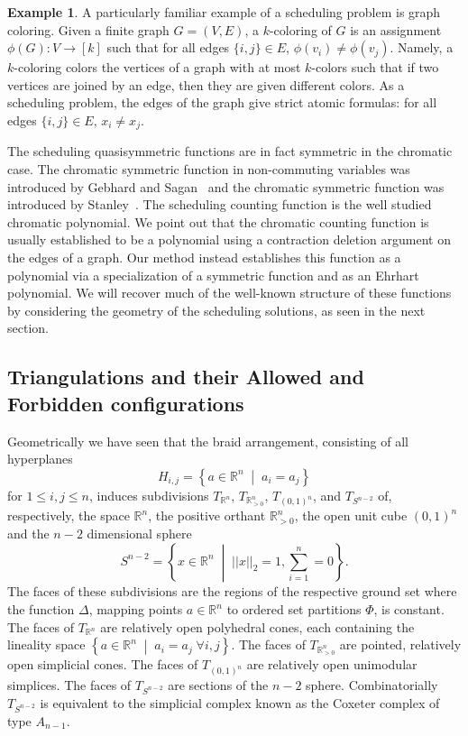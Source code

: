 \documentclass[12pt,reqno]{amsart}
\numberwithin{definition}{section}
\theoremstyle{definition}
\newtheorem{example}[definition]{Example}
\newcommand{\RR}{\mathbb{R}}
\newcommand{\SSS}{\mathcal{S}}
\newcommand{\mset}[2]{ \left\{ #1 \; \middle| \; #2 \right\}}
\newcommand{\T}{T} %
\newcommand{\TRn}{\T_{\RR^n}} %
\newcommand{\TS}{\T_{S^{n-2}}} %
\newcommand{\TP}{\T_{\RR^n_{> 0}}} %
\newcommand{\TC}{\T_{(0,1)^n}} %
\newcommand{\poly}{\chi} %
\begin{document}
\begin{example}
A particularly familiar example of a scheduling problem is graph
coloring.  Given a finite graph $G = (V,E)$, a $k$-coloring of $G$ is
an assignment $\phi(G): V \rightarrow [k]$ such that for all edges
$\{i,j\} \in E$, $\phi(v_i) \neq \phi(v_j)$.  Namely, a
$k$-coloring colors the vertices of a graph with at most $k$-colors
such that if two vertices are joined by an edge, then they are given
different colors.  As a scheduling problem, the edges of the graph
give strict atomic formulas: for all edges $\{i,j\} \in E$, $x_i
\neq x_j$.  

The scheduling quasisymmetric functions are in fact symmetric in the
chromatic case.  The chromatic symmetric function in non-commuting
variables was introduced by Gebhard and Sagan~\cite{GS} and the
chromatic symmetric function was introduced by
Stanley~\cite{stan-chromatic}.  The scheduling counting function is
the well studied chromatic polynomial.  We point out that the
chromatic counting function is usually established to be a polynomial
using a contraction deletion argument on the edges of a graph.  Our
method instead establishes this function as a polynomial via a
specialization of a symmetric function and as an Ehrhart polynomial.  We will recover much of the well-known structure of these functions by considering the geometry of the scheduling solutions, as seen in the next section.

\end{example}


\subsection{Triangulations and their Allowed and Forbidden configurations}
\label{sec:allow-forb-configurations}
Geometrically we have seen that
the braid arrangement, consisting of all hyperplanes
\[
  H_{i,j} = \mset{a\in\RR^n}{a_i = a_j}
\]
for $1\leq i,j\leq n$, induces subdivisions $\TRn$, $\TP$, $\TC$, and $\TS$ of, respectively, the space $\RR^n$, the positive orthant $\RR^n_{> 0}$, the open unit cube $(0,1)^n$ and the $n-2$ dimensional sphere
\[
S^{n-2}=\mset{x\in\RR^n}{||x||_2 = 1, \sum_{i=1}^n = 0}.
\]
 The faces of these subdivisions are the regions of the respective ground set where the function $\Delta$, mapping points $a\in\RR^n$ to ordered set partitions $\Phi$, is constant. The faces of $\TRn$ are relatively open polyhedral cones, each containing the lineality space $\mset{a\in\RR^n}{a_i=a_j \; \forall i,j}$. The faces of $\TP$ are pointed, relatively open simplicial cones. The faces of $\TC$ are relatively open unimodular simplices. The faces of $\TS$ are sections of the $n-2$ sphere. Combinatorially $\TS$ is equivalent to the simplicial complex known as the Coxeter complex of type $A_{n-1}$.
\end{document}
